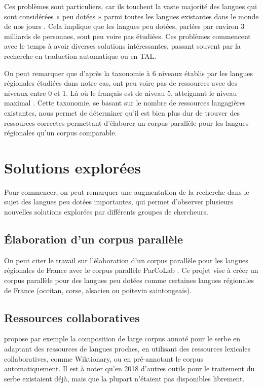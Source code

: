 Ces problèmes sont particuliers, car ils touchent la vaste majorité des langues qui sont considérées {« }peu dotées{ »}
parmi toutes les langues existantes dans le monde de nos jours \citep{sharoff_2016}.
Cela implique que les langues peu dotées, parlées par environ 3 milliards de personnes, sont peu voire pas étudiées.
Ces problèmes commencent avec le temps à avoir diverses solutions intéressantes, passant souvent par la
recherche en traduction automatique ou en TAL.

On peut remarquer que d'après
la taxonomie à 6 niveaux établis par \citep{joshi_2020} les langues régionales étudiées dans notre cas,
ont peu voire pas de ressources avec des niveaux entre 0 et 1. Là où le français est de niveau 5, atteignant
le niveau maximal \citep{stosic_2024}. Cette taxonomie, se basant sur le nombre de ressources langagières
existantes, nous permet de déterminer qu'il est bien plus dur de trouver des ressources correctes permettant
d'élaborer un corpus parallèle pour les langues régionales qu'un corpus comparable.

\section{Solutions explorées}

Pour commencer, on peut remarquer une augmentation de la recherche dans le sujet des langues peu
dotées importantes, qui permet d'observer plusieurs nouvelles solutions explorées par différents groupes de chercheurs.

\subsection{Élaboration d'un corpus parallèle}

On peut citer le travail sur l'élaboration d'un corpus parallèle pour les langues
régionales de France avec le corpus parallèle ParCoLab \citep{stosic_2024}. Ce projet vise à créer
un corpus parallèle pour des langues peu dotées comme certaines langues régionales de France
(occitan, corse, alsacien ou poitevin saintongeais).

\subsection{Ressources collaboratives}

\citet{miletic_2018} propose par exemple la composition de large corpus annoté pour le serbe en adaptant des ressources de
langues proches, en utilisant des ressources lexicales collaboratives, comme Wiktionary, ou en pré-annotant
le corpus automatiquement. Il est à noter qu'en 2018 d'autres outils pour le traitement du serbe existaient
déjà, mais que la plupart n'étaient pas disponibles librement.

